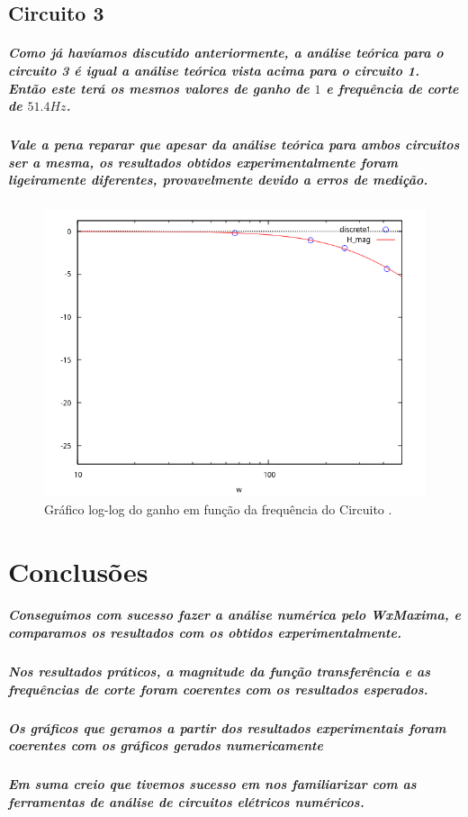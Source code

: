\documentclass[12pt,twoside, a4paper, twocolumn]{article}
\begin{document}
\pagebreak
\newpage


\subsection{Circuito 3}


\subparagraph*{Como já havíamos discutido anteriormente, a análise teórica para o circuito 3 é igual a análise teórica vista acima para o circuito 1. Então este terá os mesmos valores de ganho de $1$ e frequência de corte de $51.4Hz$.}


\subparagraph*{Vale a pena reparar que apesar da análise teórica para ambos circuitos ser a mesma, os resultados obtidos experimentalmente foram ligeiramente diferentes, provavelmente devido a erros de medição.}


\begin{figure}[h]
    \centering
    \includegraphics[width=1\columnwidth]{images/circuito3wx.png}
    \caption{Gráfico log-log do ganho em função da frequência do Circuito .}
\end{figure}


\newpage


\section{Conclusões}


\subparagraph*{Conseguimos com sucesso fazer a análise numérica pelo WxMaxima, e comparamos os resultados com os obtidos experimentalmente.}




\subparagraph*{Nos resultados práticos, a magnitude da função transferência e as frequências de corte foram coerentes com os resultados esperados.}


\subparagraph*{Os gráficos que geramos a partir dos resultados experimentais foram coerentes com os gráficos gerados numericamente}


\subparagraph*{Em suma creio que tivemos sucesso em nos familiarizar com as ferramentas de análise de circuitos elétricos numéricos.}
\end{document}
